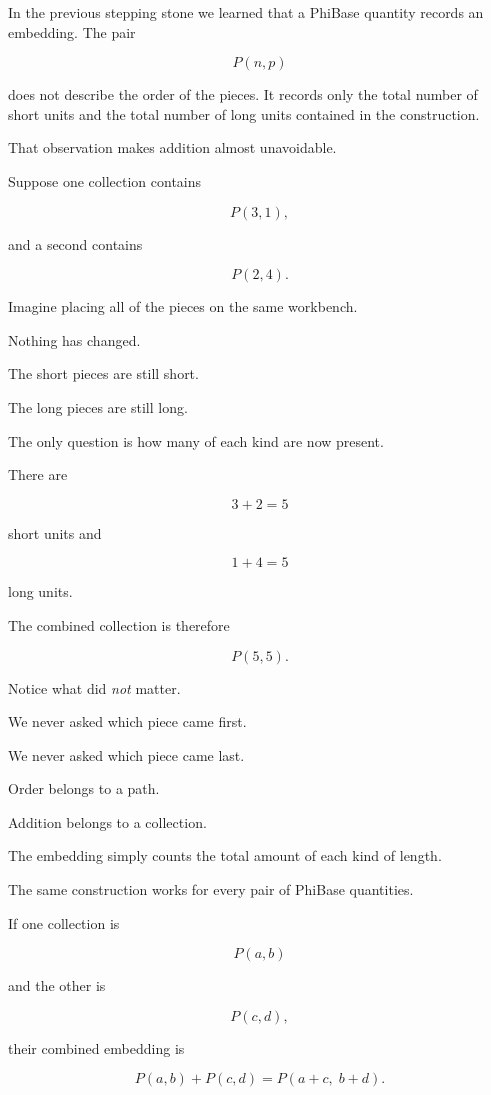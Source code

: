 \label{stone:adding}

In the previous stepping stone we learned that a PhiBase quantity records an embedding. The pair

\[
P(n,p)
\]

does not describe the order of the pieces. It records only the total number of short units and the total number of long units contained in the construction.

That observation makes addition almost unavoidable.

Suppose one collection contains

\[
P(3,1),
\]

and a second contains

\[
P(2,4).
\]

Imagine placing all of the pieces on the same workbench.

Nothing has changed.

The short pieces are still short.

The long pieces are still long.

The only question is how many of each kind are now present.

There are

\[
3+2=5
\]

short units and

\[
1+4=5
\]

long units.

The combined collection is therefore

\[
P(5,5).
\]

Notice what did \emph{not} matter.

We never asked which piece came first.

We never asked which piece came last.

Order belongs to a path.

Addition belongs to a collection.

The embedding simply counts the total amount of each kind of length.

The same construction works for every pair of PhiBase quantities.

If one collection is

\[
P(a,b)
\]

and the other is

\[
P(c,d),
\]

their combined embedding is

\[
P(a,b)+P(c,d)
=
P(a+c,\;b+d).
\]


